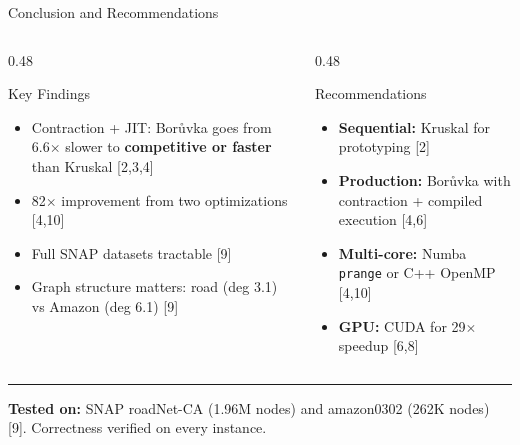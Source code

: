 \documentclass[aspectratio=169, 11pt]{beamer}
\begin{document}
\begin{frame}{Conclusion and Recommendations}
\begin{columns}[T]
\begin{column}{0.48\textwidth}
\begin{block}{Key Findings}
\begin{itemize}
    \item Contraction + JIT: Bor\r{u}vka goes from 6.6$\times$ slower to \textbf{competitive or faster} than Kruskal [2,3,4]
    \item 82$\times$ improvement from two optimizations [4,10]
    \item Full SNAP datasets tractable [9]
    \item Graph structure matters: road (deg 3.1) vs Amazon (deg 6.1) [9]
\end{itemize}
\end{block}
\end{column}
\begin{column}{0.48\textwidth}
\begin{block}{Recommendations}
\begin{itemize}
    \item \textbf{Sequential:} Kruskal for prototyping [2]
    \item \textbf{Production:} Bor\r{u}vka with contraction + compiled execution [4,6]
    \item \textbf{Multi-core:} Numba \texttt{prange} or C++ OpenMP [4,10]
    \item \textbf{GPU:} CUDA for 29$\times$ speedup [6,8]
\end{itemize}
\end{block}
\end{column}
\end{columns}
\vspace{0.3em}
\rule{\textwidth}{0.4pt}
\vspace{0.2em}
\textbf{Tested on:} SNAP roadNet-CA (1.96M nodes) and amazon0302 (262K nodes) [9]. Correctness verified on every instance.
\end{frame}
\end{document}
